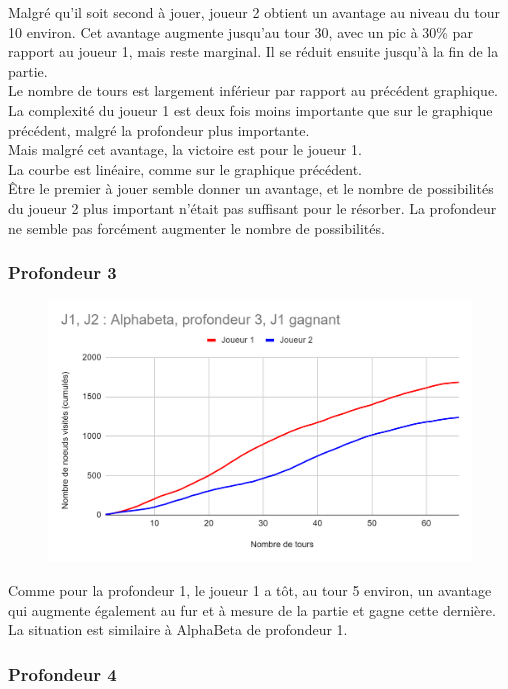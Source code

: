 \documentclass[12pt]{article}
\begin{document}
Malgré qu’il soit second à jouer, joueur 2 obtient un avantage au niveau du tour 10 environ. Cet avantage augmente jusqu’au tour 30, avec un pic à 30\% par rapport au joueur 1, mais reste marginal. Il se réduit ensuite jusqu’à la fin de la partie.\\
Le nombre de tours est largement inférieur par rapport au précédent graphique. La complexité du joueur 1 est deux fois moins importante que sur le graphique précédent, malgré la profondeur plus importante.\\
Mais malgré cet avantage, la victoire est pour le joueur 1.\\
La courbe est linéaire, comme sur le graphique précédent.\\
Être le premier à jouer semble donner un avantage, et le nombre de possibilités du joueur 2 plus important n’était pas suffisant pour le résorber. La profondeur ne semble pas forcément augmenter le nombre de possibilités.
\newpage
\subsubsection{Profondeur 3}

\begin{figure}[!h]
   \includegraphics[width=\textwidth]{prof3alphabeta.png}
\end{figure}

Comme pour la profondeur 1, le joueur 1 a tôt, au tour 5 environ, un avantage qui augmente également au fur et à mesure de la partie et gagne cette dernière.\\
La situation est similaire à AlphaBeta de profondeur 1.
\newpage
\subsubsection{Profondeur 4}
\end{document}
